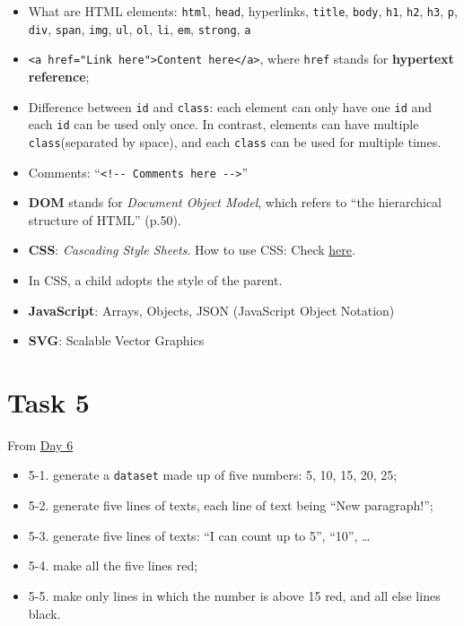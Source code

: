 \documentclass[
]{book}
\begin{document}
\begin{itemize}
\item
  What are HTML elements: \texttt{html}, \texttt{head}, hyperlinks, \texttt{title}, \texttt{body}, \texttt{h1}, \texttt{h2}, \texttt{h3}, \texttt{p}, \texttt{div}, \texttt{span}, \texttt{img}, \texttt{ul}, \texttt{ol}, \texttt{li}, \texttt{em}, \texttt{strong}, \texttt{a}
\item
  \texttt{\textless{}a\ href="Link\ here"\textgreater{}Content\ here\textless{}/a\textgreater{}}, where \texttt{href} stands for \textbf{hypertext reference};
\item
  Difference between \texttt{id} and \texttt{class}: each element can only have one \texttt{id} and each \texttt{id} can be used only once. In contrast, elements can have multiple \texttt{class}(separated by space), and each \texttt{class} can be used for multiple times.
\item
  Comments: ``\texttt{\textless{}!-\/-\ Comments\ here\ -\/-\textgreater{}}''
\item
  \textbf{DOM} stands for \emph{Document Object Model}, which refers to ``the hierarchical structure of HTML'' (p.50).
\item
  \textbf{CSS}: \emph{Cascading Style Sheets}. How to use CSS: Check \href{https://www.w3schools.com/html/html_css.asp}{here}.
\item
  In CSS, a child adopts the style of the parent.
\item
  \textbf{JavaScript}: Arrays, Objects, JSON (JavaScript Object Notation)
\item
  \textbf{SVG}: Scalable Vector Graphics
\end{itemize}

\hypertarget{task5}{%
\chapter{Task 5}\label{task5}}

From \href{https://observablehq.com/@hongtaoh/day-six}{Day 6}

\begin{itemize}
\item
  5-1. generate a \texttt{dataset} made up of five numbers: 5, 10, 15, 20, 25;
\item
  5-2. generate five lines of texts, each line of text being ``New paragraph!'';
\item
  5-3. generate five lines of texts: ``I can count up to 5'', ``10'', \ldots{}
\item
  5-4. make all the five lines red;
\item
  5-5. make only lines in which the number is above 15 red, and all else lines black.
\end{itemize}
\end{document}
